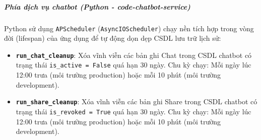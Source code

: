 \subparagraph{Phía dịch vụ chatbot (Python - code-chatbot-service)}
Python sử dụng \texttt{APScheduler} (\texttt{AsyncIOScheduler}) chạy nền tích hợp trong vòng đời (lifespan) của ứng dụng để tự động dọn dẹp CSDL lưu trữ lịch sử:
\begin{itemize}
\item \textbf{\texttt{run\_chat\_cleanup}}: Xóa vĩnh viễn các bản ghi Chat trong CSDL chatbot có trạng thái \texttt{is\_active = False} quá hạn 30 ngày. Chu kỳ chạy: Mỗi ngày lúc 12:00 trưa (môi trường production) hoặc mỗi 10 phút (môi trường development).
\item \textbf{\texttt{run\_share\_cleanup}}: Xóa vĩnh viễn các bản ghi Share trong CSDL chatbot có trạng thái \texttt{is\_revoked = True} quá hạn 30 ngày. Chu kỳ chạy: Mỗi ngày lúc 12:00 trưa (môi trường production) hoặc mỗi 10 phút (môi trường development).
\end{itemize}

